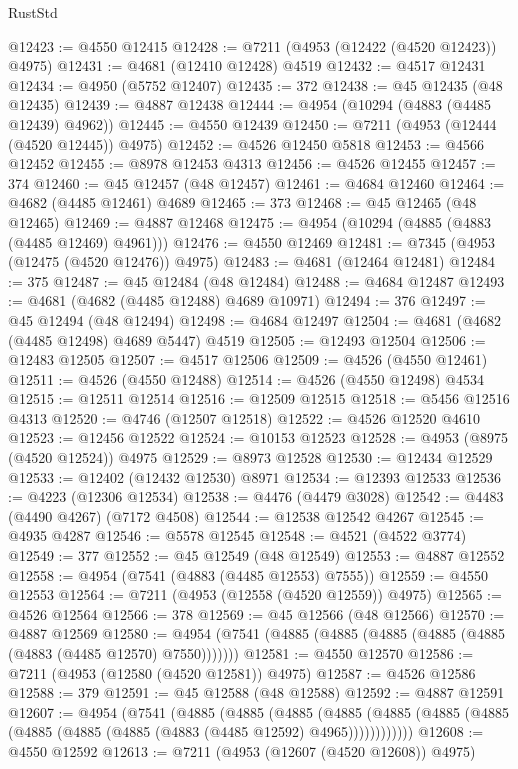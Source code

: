\begin{lexlean}{RustStd}
\begin{coremodule}
@12423 := @4550 @12415
@12428 := @7211 (@4953 (@12422 (@4520 @12423)) @4975)
@12431 := @4681 (@12410 @12428) @4519
@12432 := @4517 @12431
@12434 := @4950 (@5752 @12407)
@12435 := 372
@12438 := @45 @12435 (@48 @12435)
@12439 := @4887 @12438
@12444 := @4954 (@10294 (@4883 (@4485 @12439) @4962))
@12445 := @4550 @12439
@12450 := @7211 (@4953 (@12444 (@4520 @12445)) @4975)
@12452 := @4526 @12450 @5818
@12453 := @4566 @12452
@12455 := @8978 @12453 @4313
@12456 := @4526 @12455
@12457 := 374
@12460 := @45 @12457 (@48 @12457)
@12461 := @4684 @12460
@12464 := @4682 (@4485 @12461) @4689
@12465 := 373
@12468 := @45 @12465 (@48 @12465)
@12469 := @4887 @12468
@12475 := @4954 (@10294 (@4885 (@4883 (@4485 @12469) @4961)))
@12476 := @4550 @12469
@12481 := @7345 (@4953 (@12475 (@4520 @12476)) @4975)
@12483 := @4681 (@12464 @12481)
@12484 := 375
@12487 := @45 @12484 (@48 @12484)
@12488 := @4684 @12487
@12493 := @4681 (@4682 (@4485 @12488) @4689 @10971)
@12494 := 376
@12497 := @45 @12494 (@48 @12494)
@12498 := @4684 @12497
@12504 := @4681 (@4682 (@4485 @12498) @4689 @5447) @4519
@12505 := @12493 @12504
@12506 := @12483 @12505
@12507 := @4517 @12506
@12509 := @4526 (@4550 @12461)
@12511 := @4526 (@4550 @12488)
@12514 := @4526 (@4550 @12498) @4534
@12515 := @12511 @12514
@12516 := @12509 @12515
@12518 := @5456 @12516 @4313
@12520 := @4746 (@12507 @12518)
@12522 := @4526 @12520 @4610
@12523 := @12456 @12522
@12524 := @10153 @12523
@12528 := @4953 (@8975 (@4520 @12524)) @4975
@12529 := @8973 @12528
@12530 := @12434 @12529
@12533 := @12402 (@12432 @12530) @8971
@12534 := @12393 @12533
@12536 := @4223 (@12306 @12534)
@12538 := @4476 (@4479 @3028)
@12542 := @4483 (@4490 @4267) (@7172 @4508)
@12544 := @12538 @12542 @4267
@12545 := @4935 @4287
@12546 := @5578 @12545
@12548 := @4521 (@4522 @3774)
@12549 := 377
@12552 := @45 @12549 (@48 @12549)
@12553 := @4887 @12552
@12558 := @4954 (@7541 (@4883 (@4485 @12553) @7555))
@12559 := @4550 @12553
@12564 := @7211 (@4953 (@12558 (@4520 @12559)) @4975)
@12565 := @4526 @12564
@12566 := 378
@12569 := @45 @12566 (@48 @12566)
@12570 := @4887 @12569
@12580 := @4954 (@7541 (@4885 (@4885 (@4885 (@4885 (@4885 (@4883 (@4485 @12570) @7550)))))))
@12581 := @4550 @12570
@12586 := @7211 (@4953 (@12580 (@4520 @12581)) @4975)
@12587 := @4526 @12586
@12588 := 379
@12591 := @45 @12588 (@48 @12588)
@12592 := @4887 @12591
@12607 := @4954
    (@7541
      (@4885
        (@4885
          (@4885
            (@4885 (@4885 (@4885 (@4885 (@4885 (@4885 (@4885 (@4883 (@4485 @12592) @4965))))))))))))
@12608 := @4550 @12592
@12613 := @7211 (@4953 (@12607 (@4520 @12608)) @4975)

\end{coremodule}
\end{lexlean}
